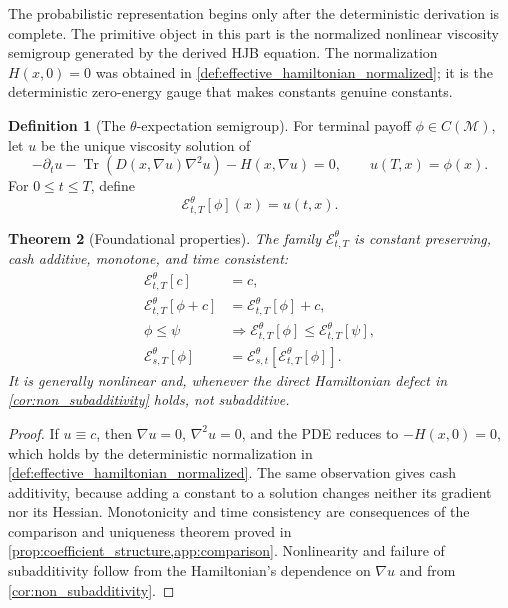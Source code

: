 \documentclass[12pt, letterpaper]{amsart}
\newcommand{\Mcal}{\mathcal{M}}
\newcommand{\Ecal}{\mathcal{E}}
\providecommand{\Tr}{\operatorname{Tr}}
\theoremstyle{plain}
\newtheorem{theorem}{Theorem}[section]
\theoremstyle{definition}
\newtheorem{definition}[theorem]{Definition}
\theoremstyle{remark}
\begin{document}
The probabilistic representation begins only after the deterministic derivation is complete.  The primitive object in this part is the normalized nonlinear viscosity semigroup generated by the derived HJB equation.  The normalization $H(x,0)=0$ was obtained in \cref{def:effective_hamiltonian_normalized}; it is the deterministic zero-energy gauge that makes constants genuine constants.

\begin{definition}[The $\theta$-expectation semigroup]
For terminal payoff $\phi\in C(\Mcal)$, let $u$ be the unique viscosity solution of
\begin{equation}
    -\partial_tu-\Tr(D(x,\nabla u)\nabla^2u)-H(x,\nabla u)=0,
    \qquad u(T,x)=\phi(x).
\end{equation}
For $0\le t\le T$, define
\begin{equation}
    \Ecal_{t,T}^\theta[\phi](x)=u(t,x).
\end{equation}
\end{definition}

\begin{theorem}[Foundational properties]
\label{thm:theta_expectation_properties}
The family $\Ecal_{t,T}^\theta$ is constant preserving, cash additive, monotone, and time consistent:
\begin{align}
    \Ecal_{t,T}^\theta[c]&=c,\\
    \Ecal_{t,T}^\theta[\phi+c]&=\Ecal_{t,T}^\theta[\phi]+c,\\
    \phi\le\psi&\Longrightarrow \Ecal_{t,T}^\theta[\phi]\le\Ecal_{t,T}^\theta[\psi],\\
    \Ecal_{s,T}^\theta[\phi]&=\Ecal_{s,t}^\theta[\Ecal_{t,T}^\theta[\phi]].
\end{align}
It is generally nonlinear and, whenever the direct Hamiltonian defect in \cref{cor:non_subadditivity} holds, not subadditive.
\end{theorem}

\begin{proof}
If $u\equiv c$, then $\nabla u=0$, $\nabla^2u=0$, and the PDE reduces to $-H(x,0)=0$, which holds by the deterministic normalization in \cref{def:effective_hamiltonian_normalized}.  The same observation gives cash additivity, because adding a constant to a solution changes neither its gradient nor its Hessian.  Monotonicity and time consistency are consequences of the comparison and uniqueness theorem proved in \cref{prop:coefficient_structure,app:comparison}.  Nonlinearity and failure of subadditivity follow from the Hamiltonian's dependence on $\nabla u$ and from \cref{cor:non_subadditivity}.
\end{proof}
\end{document}
